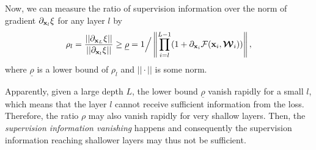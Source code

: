 \documentclass[10pt,onecolumn,letterpaper]{article}
\def\mF{{\mathcal F}}
\def\bmW{\mbox{\boldmath${\mathcal W}$}}
\def\bx{{\bf x}}
\def\mark{\textcolor{black}}
\begin{document}
Now, we can measure the ratio of supervision information over the norm of gradient ${{\partial_{\bx_l} \xi }}$   for any layer $l$ by
$$
\rho_l = \frac{||\partial_{\bx_{L}} \xi||}{||\partial_{\bx_{l}} \xi||} \geq \underline{\rho} =  1 \Big/ \left\|\prod_{i = l}^{L - 1}( {1 + \partial_{\bx_i}  {\mF({\bx_i},{{\bmW}_i})}} )\right\|,
$$
where $\underline{\rho}$ is a lower bound of $\rho_l$ and $||\cdot||$ is some norm.

Apparently, given a large depth $L$, the lower bound $\underline{\rho}$ vanish rapidly for a small $l$, which means that the layer $l$ cannot receive sufficient information from the loss. Therefore, the ratio $\rho$ may also vanish rapidly for very shallow layers. Then, the \emph{{supervision information vanishing}} happens and consequently the supervision information reaching shallower layers may thus not be sufficient.






\end{document}
